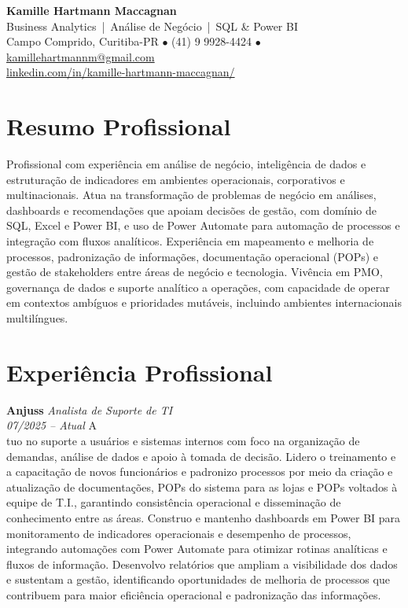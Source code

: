 \documentclass[11pt,a4paper]{article}
\newcommand{\cvrole}[4]{%
  \textbf{#1} \hfill \textit{#2}\\%
  \textcolor{subgray}{\textit{#3}} \hfill \textcolor{subgray}{#4}\\[4pt]%
}
\begin{document}
\begin{center}
  {\LARGE\bfseries Kamille Hartmann Maccagnan}\\[6pt]
  {\large Business Analytics \,|\, Análise de Negócio \,|\, SQL \& Power BI}\\[8pt]
  Campo Comprido, Curitiba-PR \quad $\bullet$ \quad (41) 9 9928-4424 \quad $\bullet$ \quad
  \href{mailto:kamillehartmannm@gmail.com}{kamillehartmannm@gmail.com}\\[2pt]
  \href{https://linkedin.com/in/kamille-hartmann-maccagnan/}{linkedin.com/in/kamille-hartmann-maccagnan/}
\end{center}

\section{Resumo Profissional}

Profissional com experiência em análise de negócio, inteligência de dados e estruturação de indicadores em ambientes operacionais, corporativos e multinacionais. Atua na transformação de problemas de negócio em análises, dashboards e recomendações que apoiam decisões de gestão, com domínio de SQL, Excel e Power BI, e uso de Power Automate para automação de processos e integração com fluxos analíticos. Experiência em mapeamento e melhoria de processos, padronização de informações, documentação operacional (POPs) e gestão de stakeholders entre áreas de negócio e tecnologia. Vivência em PMO, governança de dados e suporte analítico a operações, com capacidade de operar em contextos ambíguos e prioridades mutáveis, incluindo ambientes internacionais multilíngues.

\section{Experiência Profissional}

\cvrole{Anjuss}{Analista de Suporte de TI}{07/2025 -- Atual}

Atuo no suporte a usuários e sistemas internos com foco na organização de demandas, análise de dados e apoio à tomada de decisão. Lidero o treinamento e a capacitação de novos funcionários e padronizo processos por meio da criação e atualização de documentações, POPs do sistema para as lojas e POPs voltados à equipe de T.I., garantindo consistência operacional e disseminação de conhecimento entre as áreas. Construo e mantenho dashboards em Power BI para monitoramento de indicadores operacionais e desempenho de processos, integrando automações com Power Automate para otimizar rotinas analíticas e fluxos de informação. Desenvolvo relatórios que ampliam a visibilidade dos dados e sustentam a gestão, identificando oportunidades de melhoria de processos que contribuem para maior eficiência operacional e padronização das informações.
\end{document}
